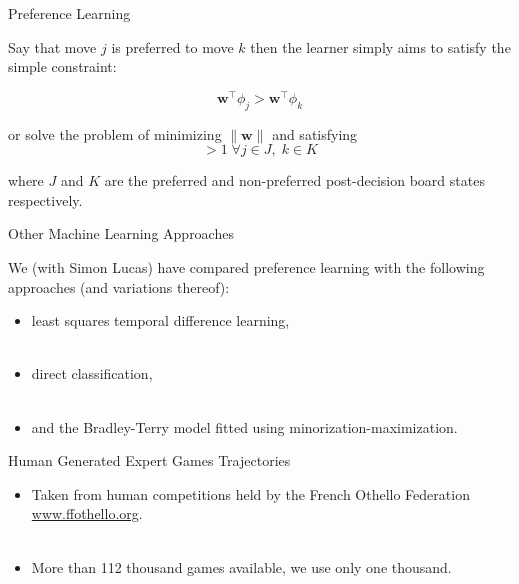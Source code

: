 \documentclass[compress]{beamer}
\renewcommand{\vec}[1]{{\mathbf #1}}
\begin{document}
\begin{frame}{Preference Learning}

\noindent
Say that move $j$ is preferred to move $k$ then the learner simply aims to satisfy the simple constraint:

\begin{equation*}
  \vec{w}^\intercal \phi_j > \vec{w}^\intercal \phi_k
\end{equation*}

or solve the problem of minimizing $\| \vec{w} \|$ and satisfying
\begin{equation*}
  [\vec{w}^\intercal(\phi_j - \phi_k)] > 1 \; \forall j \in J, \; k \in K
\end{equation*}

where $J$ and $K$ are the preferred and non-preferred post-decision board states respectively.

\end{frame}


\begin{frame}{Other Machine Learning Approaches}

We (with Simon Lucas) have compared preference learning with the following approaches (and variations thereof):

\begin{itemize}
\item least squares temporal difference learning,\\ \
\item direct classification, \\ \
\item and the Bradley-Terry model fitted using minorization-maximization.
\end{itemize}


\end{frame}
 








\begin{frame}{Human Generated Expert Games Trajectories}

\begin{itemize}
\item Taken from human competitions held by the French Othello
Federation \href{http://www.ffothello.org/}{www.ffothello.org}.\\ \
\item More than 112 thousand games available, we use only one thousand. \\ \
\end{itemize}


\end{frame}
\end{document}
